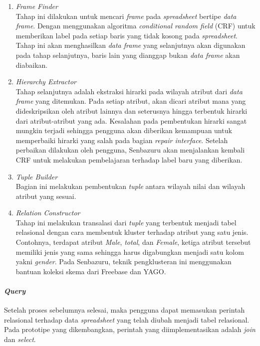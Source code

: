         \begin{enumerate}
            \item \textit{Frame Finder}\\
            Tahap ini dilakukan untuk mencari \textit{frame} pada \textit{spreadsheet} bertipe \textit{data frame}. Dengan menggunakan algoritma \textit{conditional random field} (CRF) untuk memberikan label pada setiap baris yang tidak kosong pada \textit{spreadsheet}. Tahap ini akan menghasilkan \textit{data frame} yang selanjutnya akan digunakan pada tahap selanjutnya, baris lain yang dianggap bukan \textit{data frame} akan diabaikan.

            \item \textit{Hierarchy Extractor}\\            
            Tahap selanjutnya adalah ekstraksi hirarki pada wilayah atribut dari \textit{data frame} yang ditemukan. Pada setiap atribut, akan dicari atribut mana yang dideskripsikan oleh atribut lainnya dan seterusnya hingga terbentuk hirarki dari atribut-atribut yang ada. Kesalahan pada pembentukan hirarki sangat mungkin terjadi sehingga pengguna akan diberikan kemampuan untuk memperbaiki hirarki yang salah pada bagian \textit{repair interface}. Setelah perbaikan dilakukan oleh pengguna, Senbazuru akan menjalankan kembali CRF untuk melakukan pembelajaran terhadap label baru yang diberikan.

            \item \textit{Tuple Builder}\\            
            Bagian ini melakukan pembentukan \textit{tuple} antara wilayah nilai dan wilayah atribut yang sesuai.

            \item \textit{Relation Constructor}\\
            Tahap ini melakukan transalasi dari \textit{tuple} yang terbentuk menjadi tabel relasional dengan cara membentuk kluster terhadap atribut yang satu jenis. Contohnya, terdapat atribut \textit{Male}, \textit{total}, dan \textit{Female}, ketiga atribut tersebut memiliki jenis yang sama sehingga harus digabungkan menjadi satu kolom yakni \textit{gender}. Pada Senbazuru, teknik pengklusteran ini menggunakan bantuan koleksi skema dari Freebase dan YAGO.
        \end{enumerate}

        \paragraph{\textit{Query}}
        Setelah proses sebelumnya selesai, maka pengguna dapat memasukan perintah relasional terhadap data \textit{spreadsheet} yang telah diubah menjadi tabel relasional. Pada prototipe yang dikembangkan, perintah yang diimplementasikan adalah \textit{join} dan \textit{select}.

